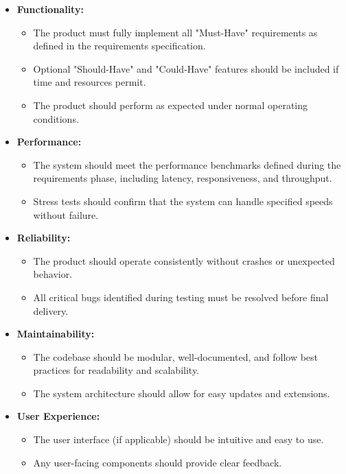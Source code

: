 \documentclass{article}
\begin{document}
\begin{itemize}[leftmargin=*, label={}]
    \item \textbf{Functionality:}
        \begin{itemize}
            \item The product must fully implement all "Must-Have" requirements as defined in the requirements specification.
            \item Optional "Should-Have" and "Could-Have" features should be included if time and resources permit.
            \item The product should perform as expected under normal operating conditions.
        \end{itemize}
    \item \textbf{Performance:}
        \begin{itemize}
            \item The system should meet the performance benchmarks defined during the requirements phase, including latency, responsiveness, and throughput.
            \item Stress tests should confirm that the system can handle specified speeds without failure.
        \end{itemize}
    \item \textbf{Reliability:}
        \begin{itemize}
            \item The product should operate consistently without crashes or unexpected behavior.
            \item All critical bugs identified during testing must be resolved before final delivery.
        \end{itemize}
    \item \textbf{Maintainability:}
        \begin{itemize}
            \item The codebase should be modular, well-documented, and follow best practices for readability and scalability.
            \item The system architecture should allow for easy updates and extensions.
        \end{itemize}
    \item \textbf{User Experience:}
        \begin{itemize}
            \item The user interface (if applicable) should be intuitive and easy to use.
            \item Any user-facing components should provide clear feedback.
        \end{itemize}
\end{itemize}
\end{document}
